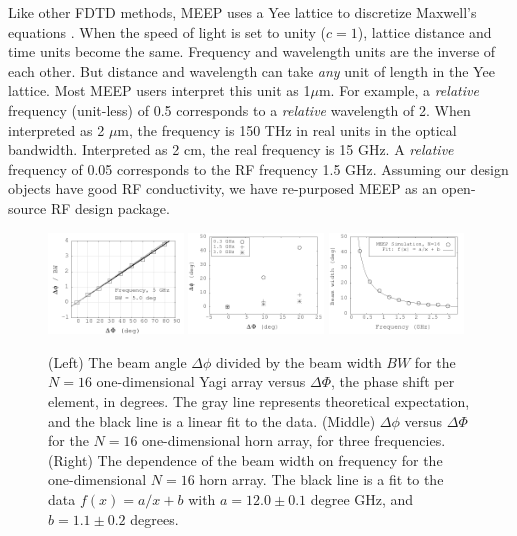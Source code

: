 \documentclass[11pt]{amsart}
\begin{document}
Like other FDTD methods, MEEP uses a Yee lattice to discretize Maxwell's equations \cite{10.1109/tap.1966.1138693}.  When the speed of light is set to unity ($c = 1$), lattice distance and time units become the same.  Frequency and wavelength units are the inverse of each other.  But distance and wavelength can take \textit{any} unit of length in the Yee lattice.  Most MEEP users interpret this unit as 1$\mu$m.  For example, a \textit{relative} frequency (unit-less) of 0.5 corresponds to a \textit{relative} wavelength of 2.  When interpreted as 2 $\mu$m, the frequency is 150 THz in real units in the optical bandwidth.  Interpreted as 2 cm, the real frequency is 15 GHz.  A \textit{relative} frequency of 0.05 corresponds to the RF frequency 1.5 GHz.  Assuming our design objects have good RF conductivity, we have re-purposed MEEP as an open-source RF design package.  

\begin{figure}[ht]
\centering
\includegraphics[width=0.32\textwidth]{figures/Oct30_plot1.png}
\includegraphics[width=0.32\textwidth]{figures/Aug11_plot2.png}
\includegraphics[width=0.32\textwidth]{figures/Aug11_plot1.png}
\caption{\label{fig:pa_1} (Left) The beam angle $\Delta \phi$ divided by the beam width $BW$ for the $N = 16$ one-dimensional Yagi array versus $\Delta \Phi$, the phase shift per element, in degrees. The gray line represents theoretical expectation, and the black line is a linear fit to the data.  (Middle) $\Delta \phi$ versus $\Delta \Phi$ for the $N=16$ one-dimensional horn array, for three frequencies.  (Right) The dependence of the beam width on frequency for the one-dimensional $N=16$ horn array.  The black line is a fit to the data $f(x) = a/x + b$ with $a=12.0\pm 0.1$ degree GHz, and $b=1.1\pm 0.2$ degrees.}
\end{figure}
\end{document}
